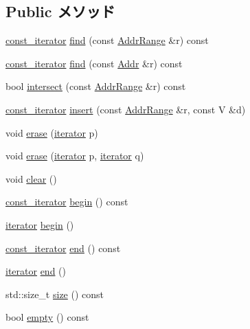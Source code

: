 \subsection*{Public メソッド}
\begin{DoxyCompactItemize}
\item 
\hyperlink{classAddrRangeMap_ab049cdad9a17cf714c462bfb9f5dbb6e}{const\_\-iterator} \hyperlink{classAddrRangeMap_aa89a64932a83b0166c2d0ef2c3427473}{find} (const \hyperlink{classAddrRange}{AddrRange} \&r) const 
\item 
\hyperlink{classAddrRangeMap_ab049cdad9a17cf714c462bfb9f5dbb6e}{const\_\-iterator} \hyperlink{classAddrRangeMap_accd4e7ea05da712a71b7e452d64e394f}{find} (const \hyperlink{base_2types_8hh_af1bb03d6a4ee096394a6749f0a169232}{Addr} \&r) const 
\item 
bool \hyperlink{classAddrRangeMap_a94d6423eb2588b05dd2b7522a5fd0d66}{intersect} (const \hyperlink{classAddrRange}{AddrRange} \&r) const 
\item 
\hyperlink{classAddrRangeMap_ab049cdad9a17cf714c462bfb9f5dbb6e}{const\_\-iterator} \hyperlink{classAddrRangeMap_ae464dba77c85b35e01680a92bd80b4cd}{insert} (const \hyperlink{classAddrRange}{AddrRange} \&r, const V \&d)
\item 
void \hyperlink{classAddrRangeMap_a1e39aaf15fad060923b688d4a936624b}{erase} (\hyperlink{classAddrRangeMap_ae61c5513b9ac04615ba7927f47c3ec69}{iterator} p)
\item 
void \hyperlink{classAddrRangeMap_a8645d9bde1addc5c75d4076d0f016a98}{erase} (\hyperlink{classAddrRangeMap_ae61c5513b9ac04615ba7927f47c3ec69}{iterator} p, \hyperlink{classAddrRangeMap_ae61c5513b9ac04615ba7927f47c3ec69}{iterator} q)
\item 
void \hyperlink{classAddrRangeMap_ac8bb3912a3ce86b15842e79d0b421204}{clear} ()
\item 
\hyperlink{classAddrRangeMap_ab049cdad9a17cf714c462bfb9f5dbb6e}{const\_\-iterator} \hyperlink{classAddrRangeMap_aa4b02d4f1a8500fb07a551069060709f}{begin} () const 
\item 
\hyperlink{classAddrRangeMap_ae61c5513b9ac04615ba7927f47c3ec69}{iterator} \hyperlink{classAddrRangeMap_ad69bd11391be1a1dba5c8202259664f8}{begin} ()
\item 
\hyperlink{classAddrRangeMap_ab049cdad9a17cf714c462bfb9f5dbb6e}{const\_\-iterator} \hyperlink{classAddrRangeMap_a350132543d80a1c1e5be844e6d2878ea}{end} () const 
\item 
\hyperlink{classAddrRangeMap_ae61c5513b9ac04615ba7927f47c3ec69}{iterator} \hyperlink{classAddrRangeMap_acad38d52497a975bfb6f2f6acd76631f}{end} ()
\item 
std::size\_\-t \hyperlink{classAddrRangeMap_a725e764d8ff6e3008f4494b38b7edca0}{size} () const 
\item 
bool \hyperlink{classAddrRangeMap_ac6e61de369e994009e36f344f99c15ad}{empty} () const 
\end{DoxyCompactItemize}
